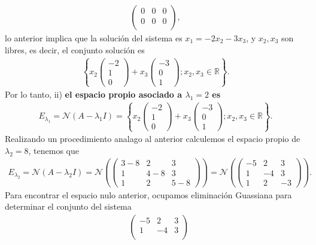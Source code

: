 \documentclass[11pt,letterpaper]{article}
\newcommand{\mR}{\mathbb{R}}
\newcommand{\mcN}{\mathcal{N}}
\begin{document}
\begin{enumerate}
\begin{align*}
\begin{pmatrix}
0 & 0 & 0\\
0 & 0 & 0\\
\end{pmatrix},
\end{align*}
lo anterior implica que la solución del sistema es $x_1=-2x_2-3x_3$, y $x_2,x_3$ son libres, es decir, el conjunto solución es
\begin{align*}
\left\{x_2\begin{pmatrix}
-2\\
1\\
0
\end{pmatrix}+x_3\begin{pmatrix}
-3\\
0\\
1
\end{pmatrix}; x_2,x_3\in \mR \right\}.
\end{align*}
Por lo tanto, ii) \textbf{el espacio propio asociado a $\lambda_1=2$ es}
\begin{align*}
E_{\lambda_1} = \mcN(A-\lambda_1 I) =\left\{x_2\begin{pmatrix}
-2\\
1\\
0
\end{pmatrix}+x_3\begin{pmatrix}
-3\\
0\\
1
\end{pmatrix}; x_2,x_3\in \mR \right\}.
\end{align*}
Realizando un procedimiento analago al anterior calculemos el espacio propio de $\lambda_2=8$, tenemos que 
\begin{align*}
E_{\lambda_2} = \mcN(A-\lambda_2 I) =\mcN\left( \begin{pmatrix}
3-8 & 2 & 3\\
1 & 4-8 & 3\\
1 & 2 & 5-8
\end{pmatrix} \right)=\mcN\left( \begin{pmatrix}
-5 & 2 & 3\\
1 & -4 & 3\\
1 & 2 & -3
\end{pmatrix} \right).
\end{align*}
Para encontrar el espacio nulo anterior, ocupamos eliminación Guassiana para determinar el conjunto del sistema
\begin{align*}
&\begin{pmatrix}
-5 & 2 & 3\\
1 & -4 & 3\\

\end{pmatrix}
\end{align*}
\end{enumerate}
\end{document}
